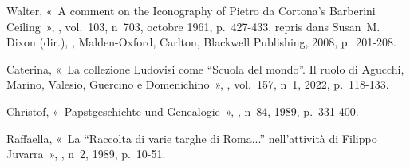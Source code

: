 \begin{teiElement}[name={TEI},change={commons\_edition}]
\begin{teiElement}[name={text},type={book},xmlid={book}]
\begin{teiElement}[name={group},type={book},xmlid={book-001}]
\begin{teiElement}[name={group},type={bibliography},data-page-title={Sources et bibliographie},data-include-href={Ch14\_Source\_bibliographie.xml},xmlid={bibliography-001}]
\begin{teiElement}[name={body}]
\begin{teiDiv}[type={section1},xmlid={div18}]
\begin{teiDiv}[type={section2},xmlid={div20}]
\begin{teiBibl}[xmlid={bibl-503}]
\end{teiBibl}
              \begin{teiBibl}[xmlid={bibl-504}]
 Walter, « A comment on the Iconography of Pietro da Cortona’s Barberini Ceiling », , vol. 103, n 703, octobre 1961, p. 427-433, repris dans Susan M. Dixon (dir.), , Malden-Oxford, Carlton, Blackwell Publishing, 2008, p. 201-208.
\end{teiBibl}
              \begin{teiBibl}[xmlid={bibl-505}]
 Caterina, « La collezione Ludovisi come “Scuola del mondo”. Il ruolo di Agucchi, Marino, Valesio, Guercino e Domenichino », , vol. 157, n 1, 2022, p. 118-133.
\end{teiBibl}
              \begin{teiBibl}[xmlid={bibl-506}]
 Christof, « Papstgeschichte und Genealogie », , n 84, 1989, p. 331-400.
\end{teiBibl}
              \begin{teiBibl}[xmlid={bibl-507}]
 Raffaella, « La “Raccolta di varie targhe di Roma...” nell’attività di Filippo Juvarra », , n 2, 1989, p. 10-51.
\end{teiBibl}
            
\end{teiDiv}
            \begin{teiDiv}[type={section2},xmlid={div21}]


\end{teiDiv}
\end{teiDiv}
\end{teiElement}
\end{teiElement}
\end{teiElement}
\end{teiElement}
\end{teiElement}
